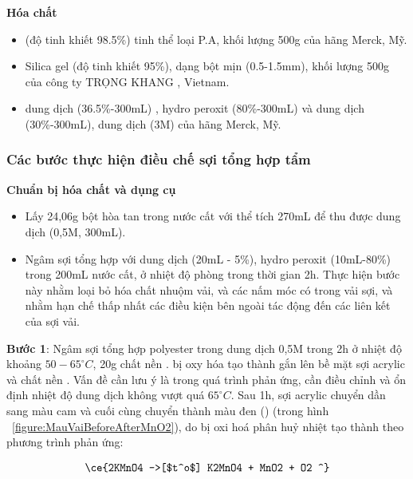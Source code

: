     \textbf{Hóa chất}
        \begin{itemize}
            \item {} (độ tinh khiết 98.5\%) tinh thể loại P.A, khối lượng 500g của hãng Merck, Mỹ.
            \item Silica gel  (độ tinh khiết 95\%), dạng bột mịn (0.5-1.5mm), khối lượng 500g của công ty TRỌNG KHANG , Vietnam.
            \item dung dịch  (36.5\%-300mL) , hydro peroxit (80\%-300mL)  và dung dịch  (30\%-300mL), dung dịch  (3M)  của hãng Merck, Mỹ.
        \end{itemize}
        

    \subsubsection{Các bước thực hiện điều chế sợi tổng hợp tẩm }
        \textbf{Chuẩn bị hóa chất và dụng cụ}
        
        \begin{itemize}
            \item  Lấy 24,06g bột  hòa tan trong nước cất với thể tích 270mL để thu được dung dịch  (0,5M, 300mL).
            \item  Ngâm sợi tổng hợp với dung dịch  (20mL - 5\%), hydro peroxit (10mL-80\%) trong 200mL nước cất, ở nhiệt độ phòng trong thời gian 2h. Thực hiện bước này nhằm loại bỏ hóa chất nhuộm vải, và các nấm móc có trong vải sợi, và nhằm hạn chế thấp nhất các điều kiện bên ngoài tác động đến các liên kết của sợi vải.\\
        \end{itemize}



        \textbf{Bước 1}: Ngâm sợi tổng hợp  polyester trong dung dịch 0,5M  trong 2h ở nhiệt độ khoảng $50 - 65 ^\circ C$, 20g chất nền  .  bị oxy hóa tạo thành  gắn lên bề mặt sợi acrylic và chất nền . Vấn đề cần lưu ý là trong quá trình phản ứng, cần điều chỉnh và ổn định nhiệt độ dung dịch không vượt quá $ 65 ^\circ C$. Sau 1h, sợi acrylic chuyển dần sang màu cam và cuối cùng chuyển thành màu đen () (trong hình ~\ref{figure:MauVaiBeforeAfterMnO2}), do  bị oxi hoá phân huỷ nhiệt  tạo thành  theo phương trình phản ứng:

        \begin{equation*}
            \ce{2KMnO4 ->[$t^o$] K2MnO4 + MnO2 + O2 ^}
        \end{equation*}

